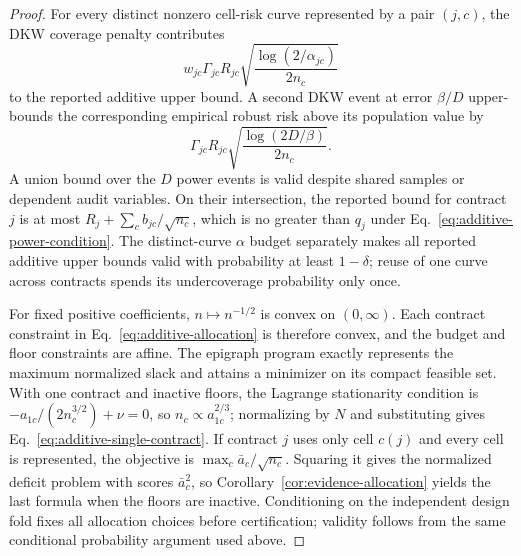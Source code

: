 \begin{proof}
For every distinct nonzero cell-risk curve represented by a pair $(j,c)$, the
DKW coverage penalty contributes
\begin{equation*}
w_{jc}\Gamma_{jc}R_{jc}
\sqrt{\frac{\log(2/\alpha_{jc})}{2n_c}}
\end{equation*}
to the reported additive upper bound. A second
DKW event at error $\beta/D$ upper-bounds the corresponding empirical robust
risk above its population value by
\begin{equation*}
\Gamma_{jc}R_{jc}\sqrt{\frac{\log(2D/\beta)}{2n_c}}.
\end{equation*}
A union bound over the $D$
power events is valid despite shared samples or dependent audit variables. On
their intersection, the reported bound for contract $j$ is at most
$R_j+\sum_cb_{jc}/\sqrt{n_c}$, which is no greater than $q_j$ under
Eq.~\eqref{eq:additive-power-condition}.
The distinct-curve $\alpha$ budget separately makes all reported additive
upper bounds valid with probability at least $1-\delta$; reuse of one curve
across contracts spends its undercoverage probability only once.

For fixed positive coefficients, $n\mapsto n^{-1/2}$ is convex on
$(0,\infty)$. Each contract constraint in Eq.~\eqref{eq:additive-allocation} is
therefore convex, and the budget and floor constraints are affine. The epigraph
program exactly represents the maximum normalized slack and attains a minimizer
on its compact feasible set. With one contract and inactive floors, the
Lagrange stationarity condition is
$-a_{1c}/(2n_c^{3/2})+\nu=0$, so $n_c\propto a_{1c}^{2/3}$; normalizing by $N$
and substituting gives Eq.~\eqref{eq:additive-single-contract}. If contract $j$
uses only cell $c(j)$ and every cell is represented, the objective is
$\max_c\bar a_c/\sqrt{n_c}$. Squaring it gives the normalized deficit problem
with scores $\bar a_c^2$, so Corollary~\ref{cor:evidence-allocation} yields the
last formula when the floors are inactive. Conditioning on the independent
design fold fixes all allocation
choices before certification; validity follows from the same conditional
probability argument used above.
\end{proof}

